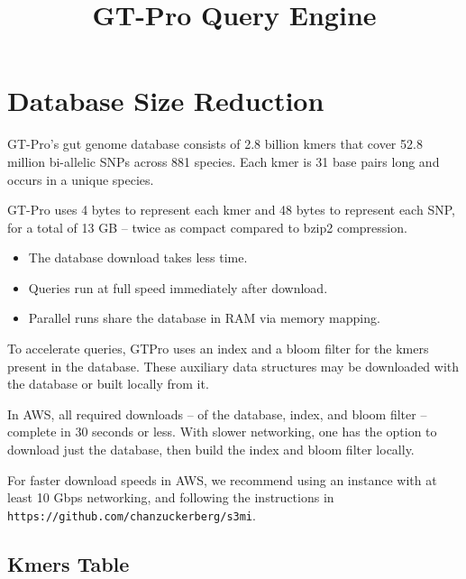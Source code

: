 \documentclass[10pt]{article}
\title{\vskip -1.2in {GT-Pro Query Engine} \vskip -0.5in}
\date{}
\begin{document}
\maketitle

\tableofcontents


\section{Database Size Reduction}


GT-Pro's gut genome database consists of 2.8 billion kmers that cover 52.8 million bi-allelic SNPs across 881 species.  Each kmer is 31 base pairs long and occurs in a unique species.

GT-Pro uses 4 bytes to represent each kmer and 48 bytes to represent each SNP, for a total of 13 GB -- twice as compact compared to bzip2 compression.
\begin{itemize}
\item The database download takes less time.
\item Queries run at full speed immediately after download.
\item Parallel runs share the database in RAM via memory mapping.
\end{itemize}

To accelerate queries, GTPro uses an index and a bloom filter for the kmers present in the database.  These auxiliary data structures may be downloaded with the database or built locally from it.

In AWS, all required downloads -- of the database, index, and bloom filter -- complete in 30 seconds or less.  With slower networking, one has the option to download just the database, then build the index and bloom filter locally.

For faster download speeds in AWS, we recommend using an instance with at least 10 Gbps networking, and following the instructions in \\ \texttt{https://github.com/chanzuckerberg/s3mi}.

\pagebreak

\subsection{Kmers Table}
\end{document}
